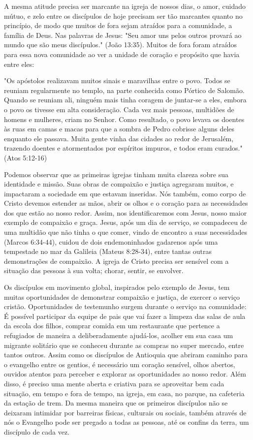 \documentclass[12pt,openright,oneside,a4paper]{abntex2}
\begin{document}
A mesma atitude precisa ser marcante na igreja de nossos dias, o amor, cuidado mútuo, e zelo entre os discípulos de hoje precisam ser tão marcantes quanto no princípio, de modo que muitos de fora sejam atraídos para a comunidade, a família de Deus. Nas palavras de Jesus: "Seu amor uns pelos outros provará ao mundo que são meus discípulos." (João 13:35). Muitos de fora foram atraídos para essa nova comunidade ao ver a unidade de coração e propósito que havia entre eles:

\begin{citacao}"Os apóstolos realizavam muitos sinais e maravilhas entre o povo. Todos se reuniam regularmente no templo, na parte conhecida como Pórtico de Salomão. Quando se reuniam ali, ninguém mais tinha coragem de juntar-se a eles, embora o povo os tivesse em alta consideração. Cada vez mais pessoas, multidões de homens e mulheres, criam no Senhor. Como resultado, o povo levava os doentes às ruas em camas e macas para que a sombra de Pedro cobrisse alguns deles enquanto ele passava. Muita gente vinha das cidades ao redor de Jerusalém, trazendo doentes e atormentados por espíritos impuros, e todos eram curados." (Atos 5:12-16)\end{citacao}

Podemos observar que as primeiras igrejas tinham muita clareza sobre sua identidade e missão. Suas obras de compaixão e justiça agregaram muitos, e impactaram a sociedade em que estavam inseridas. Nós também, como corpo de Cristo devemos estender as mãos, abrir os olhos e o coração para as necessidades dos que estão ao nosso redor. Assim, nos identificaremos com Jesus, nosso maior exemplo de compaixão e graça. Jesus, após um dia de serviço, se compadeceu de uma multidão que não tinha o que comer, vindo de encontro a suas necessidades (Marcos 6:34-44), cuidou de dois endemoninhados gadarenos após uma tempestade no mar da Galileia (Mateus 8:28-34), entre tantas outras demonstrações de compaixão. A igreja de Cristo precisa ser sensível com a situação das pessoas à sua volta; chorar, sentir, se envolver\cite[p. 172]{brandao}.

Os discípulos em movimento global, inspirados pelo exemplo de Jesus, tem muitas oportunidades de demonstrar compaixão e justiça, de exercer o serviço cristão. Oportunidades de testemunho surgem durante o serviço na comunidade: É possível participar da equipe de pais que vai fazer a limpeza das salas de aula da escola dos filhos, comprar comida em um restaurante que pertence a refugiados de maneira a deliberadamente ajudá-los, acolher em sua casa um migrante solitário que se conheceu durante as compras no super mercado, entre tantos outros. Assim como os discípulos de Antioquia que abriram caminho para o evangelho entre os gentios, é necessário um coração sensível, olhos abertos, ouvidos atentos para perceber e explorar as oportunidades ao nosso redor. Além disso, é preciso uma mente aberta e criativa para se aproveitar bem cada situação, em tempo e fora de tempo, na igreja, em casa, no parque, na cafeteria da estação de trem. Da mesma maneira que os primeiros discípulos não se deixaram intimidar por barreiras físicas, culturais ou sociais, também através de nós o Evangelho pode ser pregado a todas as pessoas, até os confins da terra, um discípulo de cada vez.
\end{document}

